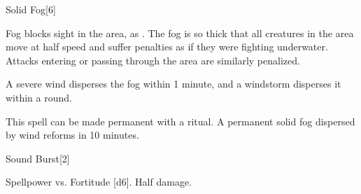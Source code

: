 \begin{spellsection}{Solid Fog}[6]
    \begin{spellheader}
    \end{spellheader}
    \begin{spellcontent}
        \begin{spelltargetinginfo}
        \end{spelltargetinginfo}
        \begin{spelleffects}
            \spelleffect Fog blocks sight in the area, as . The fog is so thick that all creatures in the area move at half speed and suffer penalties as if they were fighting underwater. Attacks entering or passing through the area are similarly penalized.
            \spelldur \durshort
        \end{spelleffects}
    \end{spellcontent}
    \begin{spellfooter}
        \spellnotes \fogspellnotes A severe wind disperses the fog within 1 minute, and a windstorm disperses it within a round.

        \physicalspellnotes

        This spell can be made permanent with a  ritual. A permanent solid fog dispersed by wind reforms in 10 minutes.
        \miscastyou
    \end{spellfooter}
\end{spellsection}

\begin{spellsection}{Sound Burst}[2]
    \begin{spellheader}
    \end{spellheader}
    \begin{spellcontent}
        \begin{spelltargetinginfo}
        \end{spelltargetinginfo}
        \begin{spelleffects}
            \begin{spellattack}{Spellpower vs. Fortitude}
                \spellsuccess {}[d6].
                \spellfailure Half damage.
            \end{spellattack}
        \end{spelleffects}
    \end{spellcontent}
    \begin{spellfooter}
        \miscastyou
    \end{spellfooter}
\end{spellsection}

